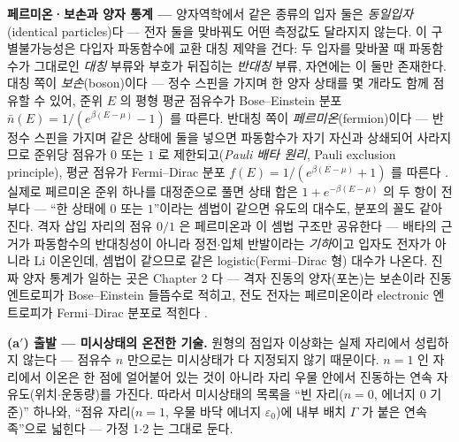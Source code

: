 \begin{bgbox}
\textbf{페르미온·보손과 양자 통계 ---} 양자역학에서 같은 종류의 입자 둘은
\emph{동일입자}(identical particles)다 --- 전자 둘을 맞바꿔도 어떤 측정값도 달라지지 않는다. 이
구별불가능성은 다입자 파동함수에 교환 대칭 제약을 건다: 두 입자를 맞바꿀 때 파동함수가 그대로인
\emph{대칭} 부류와 부호가 뒤집히는 \emph{반대칭} 부류, 자연에는 이 둘만 존재한다. 대칭 쪽이
\emph{보손}(boson)이다 --- 정수 스핀을 가지며 한 양자 상태를 몇 개라도 함께 점유할 수 있어, 준위 $E$ 의
평형 평균 점유수가 Bose--Einstein 분포 $\bar n(E)=1/(e^{\beta(E-\mu)}-1)$ 를 따른다. 반대칭 쪽이
\emph{페르미온}(fermion)이다 --- 반정수 스핀을 가지며 같은 상태에 둘을 넣으면 파동함수가 자기 자신과
상쇄되어 사라지므로 준위당 점유가 $0$ 또는 $1$ 로 제한되고(\emph{Pauli 배타 원리}, Pauli exclusion
principle), 평균 점유가 Fermi--Dirac 분포 $f(E)=1/(e^{\beta(E-\mu)}+1)$ 를 따른다 \cite{mcquarrie1976}.
실제로 페르미온 준위 하나를 대정준으로 풀면 상태 합은 $1+e^{-\beta(E-\mu)}$ 의 두 항이 전부다 ---
``한 상태에 $0$ 또는 $1$''이라는 셈법이 같으면 유도의 대수도, 분포의 꼴도 같아진다. 격자 삽입 자리의
점유 $0/1$ 은 페르미온과 이 셈법 구조만 공유한다 --- 배타의 근거가 파동함수의 반대칭성이 아니라
정전$\cdot$입체 반발이라는 \emph{기하}이고 입자도 전자가 아니라 Li 이온인데, 셈법이 같으므로 같은
logistic(Fermi--Dirac 형) 대수가 나온다. 진짜 양자 통계가 일하는 곳은 Chapter 2 다 --- 격자 진동의
양자(포논)는 보손이라 진동 엔트로피가 Bose--Einstein 들뜸수로 적히고, 전도 전자는 페르미온이라
electronic 엔트로피가 Fermi--Dirac 분포로 적힌다 \cite{mcquarrie1976,ashcroftmermin1976}.
\end{bgbox}

\textbf{(a$'$) 출발 --- 미시상태의 온전한 기술.} 원형의 점입자 이상화는 실제 자리에서 성립하지 않는다 ---
점유수 $n$ 만으로는 미시상태가 다 지정되지 않기 때문이다. $n=1$ 인 자리에서 이온은 한 점에 얼어붙어
있는 것이 아니라 자리 우물 안에서 진동하는 연속 자유도(위치$\cdot$운동량)를 가진다. 따라서 미시상태의
목록을 ``빈 자리($n=0$, 에너지 $0$ 기준)'' 하나와, ``점유 자리($n=1$, 우물 바닥 에너지
$\varepsilon_0$)에 내부 배치 $\Gamma$ 가 붙은 연속족''으로 넓힌다 --- 가정 1$\cdot$2 는 그대로 둔다.


